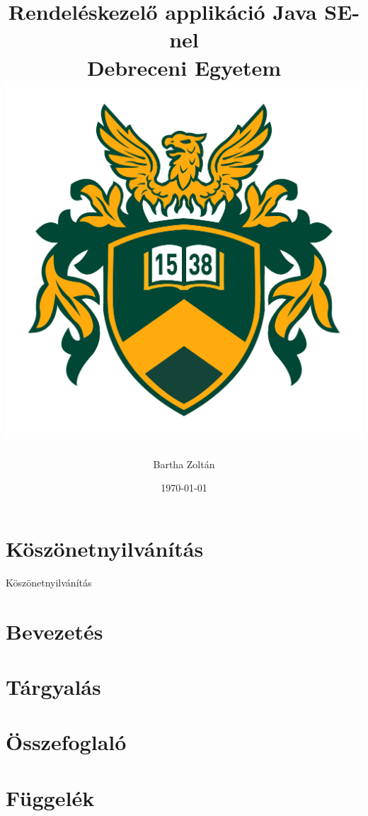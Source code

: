\documentclass[12pt]{report}
\title{
	{Rendeléskezelő applikáció Java SE-nel} \\
	{\large Debreceni Egyetem} \\
	{\includegraphics{ud-logo.png}}
}
\author{Bartha Zoltán}
\date{\today}
\begin{document}

	
	
	
	
	\chapter*{Köszönetnyilvánítás}
	Köszönetnyilvánítás
	
	\tableofcontents
	
	\chapter{Bevezetés}
	
	
	
	\chapter{Tárgyalás}

	
	
	\chapter{Összefoglaló}

	
	
	\printbibliography[
	heading=bibnumbered, title={Irodalomjegyzék}]
	
	\chapter{Függelék}
	
	
	
\end{document}
